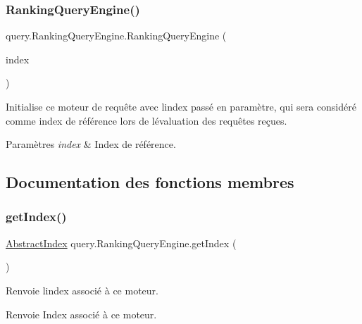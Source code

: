 \subsubsection{\texorpdfstring{Ranking\+Query\+Engine()}{RankingQueryEngine()}}
{\footnotesize\ttfamily query.\+Ranking\+Query\+Engine.\+Ranking\+Query\+Engine (\begin{DoxyParamCaption}\item[{\hyperlink{classindexation_1_1AbstractIndex}{Abstract\+Index}}]{index }\end{DoxyParamCaption})}

Initialise ce moteur de requête avec l\textquotesingle{}index passé en paramètre, qui sera considéré comme index de référence lors de l\textquotesingle{}évaluation des requêtes reçues.


\begin{DoxyParams}{Paramètres}
{\em index} & Index de référence. \\
\hline
\end{DoxyParams}


\subsection{Documentation des fonctions membres}
\mbox{\label{classquery_1_1RankingQueryEngine_a8fef863acbc5aeea67f3d1eac48c06d1}} 
\subsubsection{\texorpdfstring{get\+Index()}{getIndex()}}
{\footnotesize\ttfamily \hyperlink{classindexation_1_1AbstractIndex}{Abstract\+Index} query.\+Ranking\+Query\+Engine.\+get\+Index (\begin{DoxyParamCaption}{ }\end{DoxyParamCaption})}

Renvoie l\textquotesingle{}index associé à ce moteur.

\begin{DoxyReturn}{Renvoie}
Index associé à ce moteur. 
\end{DoxyReturn}
\mbox{\label{classquery_1_1RankingQueryEngine_ab83cc958288fcdfede4ae5d9a3bdf0fa}} 
